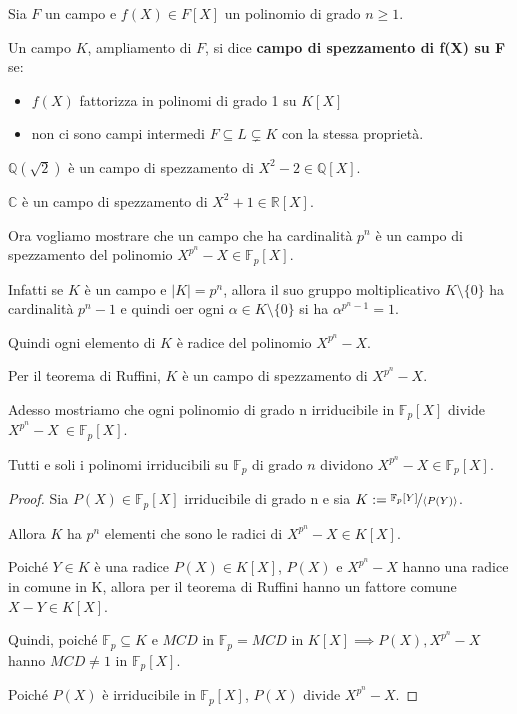 \documentclass[../main.tex]{subfiles}
\begin{document}
\begin{definition}
    Sia $F$ un campo e $f(X) \in F[X]$ un polinomio di grado $n \geq 1$.

    Un campo $K$, ampliamento di $F$, si dice \textbf{campo di spezzamento di f(X) su F} se:
    \begin{itemize}
        \item $f(X)$ fattorizza in polinomi di grado 1 su $K[X]$
        \item non ci sono campi intermedi $F \subseteq L \subsetneq K$ con la stessa proprietà.
    \end{itemize}
\end{definition}

\begin{example}
    $\mathbb{Q}(\sqrt{2})$ è un campo di spezzamento di $X^2 - 2 \in \mathbb{Q}[X]$.

    $\mathbb{C}$ è un campo di spezzamento di $X^2 + 1 \in \mathbb{R}[X]$.
\end{example}

Ora vogliamo mostrare che un campo che ha cardinalità $p^n$ è un campo di spezzamento del polinomio $X^{p^n} - X \in \mathbb{F}_p[X]$.

Infatti se $K$ è un campo e $|K| = p^n$, allora il suo gruppo moltiplicativo $K \setminus \{0\}$ ha cardinalità $p^n - 1$ e quindi oer ogni $\alpha \in K \setminus \{0\}$ si ha $\alpha^{p^n - 1} = 1$.

Quindi ogni elemento di $K$ è radice del polinomio $X^{p^n} - X$.

Per il teorema di Ruffini, $K$ è un campo di spezzamento di $X^{p^n} - X$.

Adesso mostriamo che ogni polinomio di grado n irriducibile in $\mathbb{F}_p[X]$ divide $X^{p^n} - X\ \in \mathbb{F}_p[X]$.

\begin{proposition}
    Tutti e soli i polinomi irriducibili su $\mathbb{F}_p$ di grado $n$ dividono $X^{p^n} - X \in \mathbb{F}_p[X]$.
\end{proposition}

\begin{proof}
    Sia $P(X) \in \mathbb{F}_p[X]$ irriducibile di grado n e sia $K := \nicefrac{\mathbb{F}_p[Y]}{\langle P(Y)\rangle}$.

    Allora $K$ ha $p^n$ elementi che sono le radici di $X^{p^n} - X \in K[X]$.

    Poiché $Y \in K$ è una radice $P(X) \in K[X]$, $P(X)$ e $X^{p^n} - X$ hanno una radice in comune in K, allora per il teorema di Ruffini hanno un fattore comune $X - Y \in K[X]$.

    Quindi, poiché $\mathbb{F}_p \subseteq K$ e $MCD$ in $\mathbb{F}_p = MCD$ in $K[X] \implies P(X), X^{p^n} - X$ hanno $MCD \neq 1$ in $\mathbb{F}_p[X]$.

    Poiché $P(X)$ è irriducibile in $\mathbb{F}_p[X]$, $P(X)$ divide $X^{p^n} - X$.
\end{proof}
\end{document}
